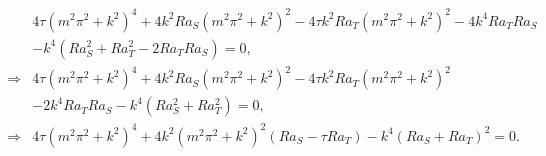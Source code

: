 \documentclass{article}
\begin{document}
\begin{align}\label{eq:energy_marginal_stab}
\begin{split}
 & 4\tau (m^{2}\pi^{2} + k^{2})^{4} + 4 k^{2}Ra_{S} (m^{2}\pi^{2} + k^{2})^{2} - 4\tau k^{2} Ra_{T} (m^{2}\pi^{2} + k^{2})^{2} - 4 k^{4} Ra_{T}Ra_{S} \\
 & - k^{4}(Ra_{S}^{2} + Ra_{T}^{2} - 2 Ra_{T}Ra_{S}) = 0,\\
 \Rightarrow &4\tau (m^{2}\pi^{2} + k^{2})^{4} + 4 k^{2}Ra_{S} (m^{2}\pi^{2} + k^{2})^{2} - 4\tau k^{2} Ra_{T} (m^{2}\pi^{2} + k^{2})^{2}\\
 &- 2 k^{4} Ra_{T}Ra_{S} - k^{4}(Ra_{S}^{2} + Ra_{T}^{2}) = 0, \\
 \Rightarrow & \boxed{4\tau (m^{2}\pi^{2} + k^{2})^{4} + 4 k^{2}(m^{2}\pi^{2} + k^{2})^{2}(Ra_{S} - \tau Ra_{T} ) - k^{4}(Ra_{S} + Ra_{T})^{2} = 0}.
\end{split}
\end{align}
%
\end{document}
